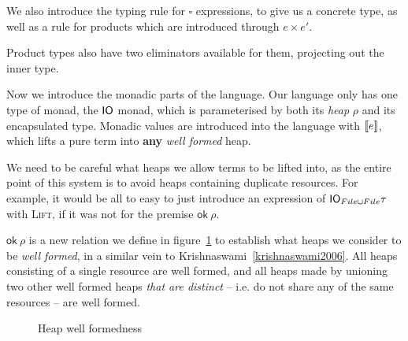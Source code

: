 We also introduce the typing rule for $\square$ expressions, to give us a
concrete type, as well as a rule for products which are introduced
through $e \times e'$.
Product types also have two eliminators available for them, projecting
out the inner type.

Now we introduce the monadic parts of the language. Our language only
has one type of monad, the $\IO$ monad, which is parameterised by both
its \textit{heap} $\rho$ and its encapsulated type. Monadic values are
introduced into the language with $\lift{e}$, which lifts a pure term into
\textbf{any} \textit{well formed} heap. 
\begin{mathpar}
\end{mathpar}
We need to be careful what heaps we allow terms to be lifted into, as
the entire point of this system is to avoid heaps containing duplicate
resources. For example, it would be all to easy to just introduce an
expression of $\IO_{File \cup File} \tau$ with \textsc{Lift}, if it was not
for the premise $\textsf{ok} \ \rho$.

$\textsf{ok} \ \rho$ is a new relation we define in
figure~\ref{fig:heapwellformedness} to establish what heaps we
consider to be \textit{well formed}, in a similar vein to
Krishnaswami~\ref{krishnaswami2006}. All heaps consisting of a single
resource are well formed, and all heaps made by unioning two other well
formed heaps \textit{that are distinct} -- i.e. do not share any of the
same resources -- are well formed.
\begin{figure}
  \centering
  \caption{Heap well formedness}
  \label{fig:heapwellformedness}
\end{figure}

